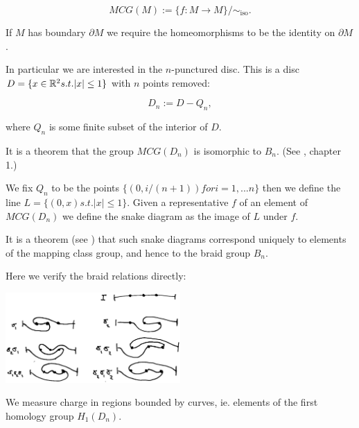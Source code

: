 \documentclass[12pt,a4paper]{article}
\begin{document}
    $$ MCG(M) := \{ f : M \to M \} / \sim_{\text{iso}}.$$

If $M$ has boundary $\partial M$ we require the homeomorphisms to
be the identity on $\partial M$.

In particular we are interested in
 the $n$-punctured disc.
This is a disc $D = \{ x\in \mathbb{R}^2 s.t. |x|\leq 1 \} $
with $n$ points removed:

    $$ D_n := D - Q_n,$$

where $Q_n$ is some finite subset of the interior of $D$.


It is a theorem that the group $MCG(D_n)$ is isomorphic to $B_n.$
(See \cite{Kassel10}, chapter 1.)

We fix $Q_n$ to be the points $\{(0, i/(n+1)) for i=1,...n\}$
then we define the line $L = \{(0, x) s.t. |x|\leq 1\}.$
Given a representative $f$ of an element of $MCG(D_n)$
we define the
snake diagram as the
image of $L$ under $f$.

It is a theorem (see \cite{Dehornoy02}) that such snake diagrams
correspond uniquely to elements of the mapping class group, and
hence to the braid group $B_n$.

Here we verify the braid relations directly:

\begin{center}
\includegraphics[width=0.5\textwidth]{curve-braid.eps}
\end{center}




We measure charge in regions bounded by curves, ie. elements of
the first homology group $H_1(D_n).$






{}

\end{document}
